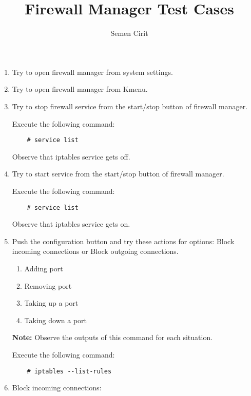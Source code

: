 \documentclass[a4paper,10pt]{article}
\title{Firewall Manager Test Cases}
\author{Semen Cirit}
\begin{document}
\maketitle

\begin{enumerate}
    \item Try to open firewall manager from system settings.
    \item Try to open firewall manager from Kmenu.
    \item Try to stop firewall service from the start/stop button of firewall manager.

    Execute the following command:

\begin{verbatim}
    # service list
\end{verbatim} 

    Observe that iptables service gets off.

    \item Try to start service from the start/stop button of firewall manager.

        Execute the following command:

\begin{verbatim}
    # service list
\end{verbatim}

       Observe that iptables service gets on.

\item Push the configuration button and try these actions for options: Block incoming connections or Block outgoing connections.
    \begin{enumerate}
        \item Adding  port
        \item Removing port
        \item Taking up a port
        \item Taking down a port
    \end{enumerate}

\textbf{Note:} Observe the outputs of this command for each situation.

Execute the following command:

\begin{verbatim}
    # iptables --list-rules
\end{verbatim} 

\item Block incoming connections:


\end{enumerate}
\end{document}
